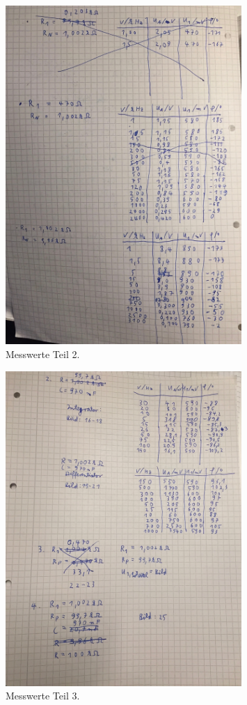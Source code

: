 \begin{figure}
  \centering
  \includegraphics[width=0.8\textwidth]{Messwerte/2.jpg}
  \caption{Messwerte Teil 2.}
  \label{fig:messwerte2}
\end{figure}
\begin{figure}
  \centering
  \includegraphics[width=0.8\textwidth]{Messwerte/3.jpg}
  \caption{Messwerte Teil 3.}
  \label{fig:messwerte3}
\end{figure}
